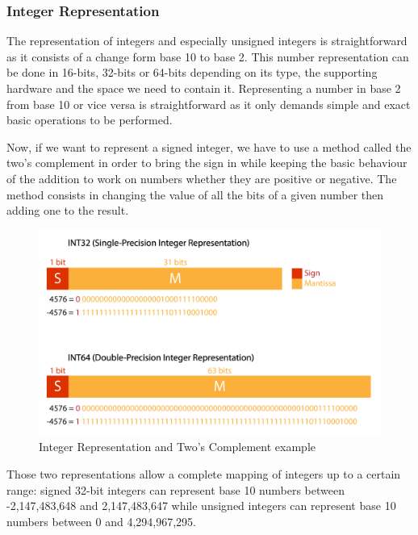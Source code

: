 \subsubsection{Integer Representation}

The representation of integers and especially unsigned integers is straightforward as it consists of a change form base 10 to base 2. This number representation can be done in 16-bits, 32-bits or 64-bits depending on its type, the supporting hardware and the space we need to contain it. Representing a number in base 2 from base 10 or vice versa is straightforward as it only demands simple and exact basic operations to be performed.

Now, if we want to represent a signed integer, we have to use a method called the two's complement in order to bring the sign in while keeping the basic behaviour of the addition to work on numbers whether they are positive or negative. The method consists in changing the value of all the bits of a given number then adding one to the result.

\begin{figure}[htbp]
	\centering
		\includegraphics[width=12cm]{Figures/IntegerRepr.png}
	\caption[Integer Representation]{Integer Representation and Two's Complement example}
	\label{fig:IntegerRepr}
\end{figure}

Those two representations allow a complete mapping of integers up to a certain range: signed 32-bit integers can represent base 10 numbers between -2,147,483,648 and 2,147,483,647 while unsigned integers can represent base 10 numbers between 0 and 4,294,967,295.

